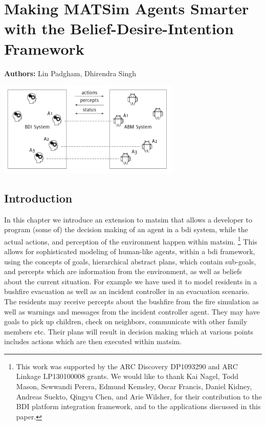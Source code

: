 \chapter{Making MATSim Agents Smarter with the Belief-Desire-Intention Framework}
\label{ch:bdi}

\hfill \textbf{Authors:} Lin Padgham, Dhirendra Singh

\begin{center} \includegraphics[width=0.65\textwidth, angle=0]{extending/figures/bdi/title.png} \end{center}


\section{Introduction}
\label{sec:bdi-intro}
In this chapter we introduce an extension to \gls{matsim} that allows a
developer to program (some of) the decision making of an agent in a \gls{bdi} system, while the actual actions, and
perception of the environment happen within \gls{matsim}.
\footnote{This work was supported by the ARC Discovery 
DP1093290 and ARC Linkage LP130100008 grants. We would like to thank Kai Nagel, 
Todd Mason, Sewwandi Perera, Edmund Kemsley, Oscar Francis, Daniel Kidney, Andreas
Suekto, Qingyu Chen, and Arie Wilsher, for their contribution to the BDI platform 
integration framework, and to the applications discussed in this paper.} 
This allows for
sophisticated modeling of human-like agents, within a \gls{bdi}
framework, using the concepts of goals, hierarchical abstract plans,
which contain sub-goals, and percepts which are information from the
environment, as well as beliefs about the current situation. For
example we have used it to model residents in a 
bushfire evacuation as well as an incident controller in an evacuation
scenario. The residents may receive percepts about the bushfire from
the fire simulation as well as warnings and messages from the incident
controller agent. They may
have goals to pick up children, check on neighbors, communicate with
other family members etc. Their plans will result in
decision making which at various points includes actions which are then
executed within \gls{matsim}.

